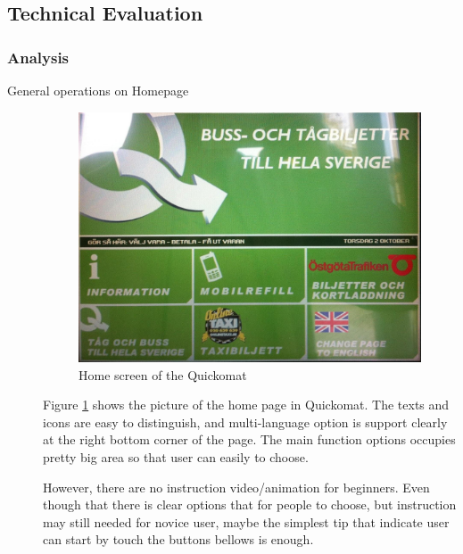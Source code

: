 \documentclass[twocolumn]{article}
\begin{document}
\subsection{Technical Evaluation}

\subsubsection{Analysis}
\begin{description}
  \item[General operations on Homepage]
    \begin{figure}
      \centering
      \includegraphics[width=\columnwidth]{fig/home-of-quickomat.jpg}
      \caption{Home screen of the Quickomat}
      \label{fig:home-of-quickomat}
    \end{figure}

    Figure \ref{fig:home-of-quickomat} shows the picture of the home page in Quickomat. The texts and icons are easy to distinguish, and multi-language option is support clearly at the right bottom corner of the page. The main function options occupies pretty big area so that user can easily to choose.

    However, there are no instruction video/animation for beginners. Even though that there is clear options that for people to choose, but instruction may still needed for novice user, maybe the simplest tip that indicate user can start by touch the buttons bellows is enough.


\end{description}
\end{document}

